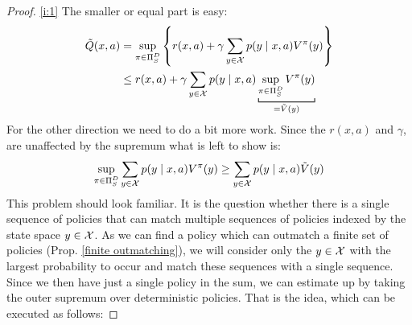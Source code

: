 \begin{proof} \ref{i:1} The smaller or equal part is easy:
	\begin{align*}
		\tilde{Q}(x,a)&= \sup_{\pi \in \detPolicy} \left\{r(x,a)
		+\gamma\sum_{y\in\cX}p(y\mid x,a) V^\pi(y)\right\}\\
		&\le r(x,a) +\gamma\sum_{y\in\cX}p(y\mid x,a) \underbracket[0.7pt]{\sup_{\pi \in \detPolicy}V^\pi(y)}_{=\tilde{V}(y)}
	\end{align*}
	For the other direction we need to do a bit more work. Since the \(r(x,a)\) and \(\gamma\), are unaffected by the supremum what is left to show is:
	\[
		\sup_{\pi \in \Pi_S^D}\sum_{y\in\mathcal{X}}p(y\mid x,a) V^\pi(y)
		\ge\sum_{y\in\mathcal{X}}p(y\mid x,a)\tilde{V}(y)
	\]
	This problem should look familiar. It is the question whether there is a single sequence of policies that can match multiple sequences of policies indexed by the state space \(y\in\mathcal{X}\).	As we can find a policy which can outmatch a finite set of policies (Prop. \ref{finite outmatching}), we will consider only the \(y\in\mathcal{X}\) with the largest probability to occur and match these sequences with a single sequence. Since we then have just a single policy in the sum, we can estimate up by taking the outer supremum over deterministic policies. That is the idea, which can be executed as follows:
	

\end{proof}
